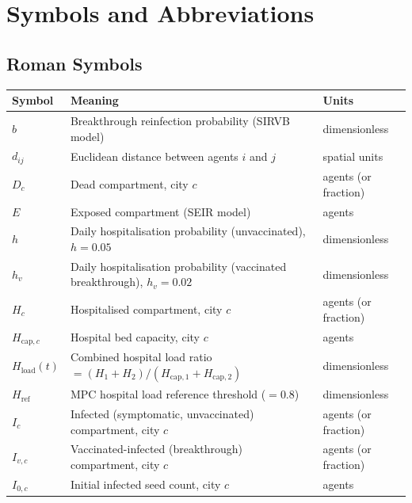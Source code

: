 

\chapter*{Symbols and Abbreviations}

\section*{Roman Symbols}

\begin{tabular}{@{}lll@{}}
\toprule
\textbf{Symbol} & \textbf{Meaning} & \textbf{Units} \\
\midrule
$b$         & Breakthrough reinfection probability (SIRVB model)              & dimensionless \\
$d_{ij}$    & Euclidean distance between agents $i$ and $j$                   & spatial units \\
$D_c$       & Dead compartment, city $c$                                      & agents (or fraction) \\
$E$         & Exposed compartment (SEIR model)                                & agents \\
$h$         & Daily hospitalisation probability (unvaccinated), $h=0.05$      & dimensionless \\
$h_v$       & Daily hospitalisation probability (vaccinated breakthrough), $h_v=0.02$ & dimensionless \\
$H_c$       & Hospitalised compartment, city $c$                              & agents (or fraction) \\
$H_{\mathrm{cap},c}$ & Hospital bed capacity, city $c$                       & agents \\
$H_{\mathrm{load}}(t)$ & Combined hospital load ratio $= (H_1+H_2)/(H_{\mathrm{cap},1}+H_{\mathrm{cap},2})$ & dimensionless \\
$H_{\mathrm{ref}}$  & MPC hospital load reference threshold ($=0.8$)           & dimensionless \\
$I_c$       & Infected (symptomatic, unvaccinated) compartment, city $c$      & agents (or fraction) \\
$I_{v,c}$   & Vaccinated-infected (breakthrough) compartment, city $c$        & agents (or fraction) \\
$I_{0,c}$   & Initial infected seed count, city $c$                          & agents \\

\end{tabular}
